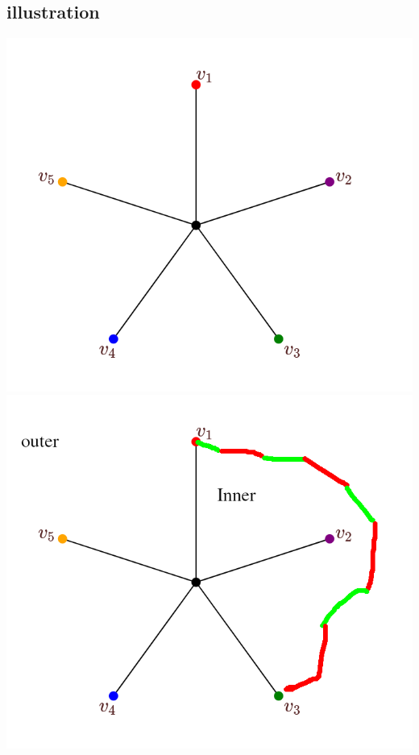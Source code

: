 \documentclass{article}
\begin{document}
\newpage
\subsection*{illustration}
\includegraphics{images/ch5-five-coloring-p1.png}
\includegraphics{images/ch5-five-coloring-p2.png}

\newpage
\end{document}
